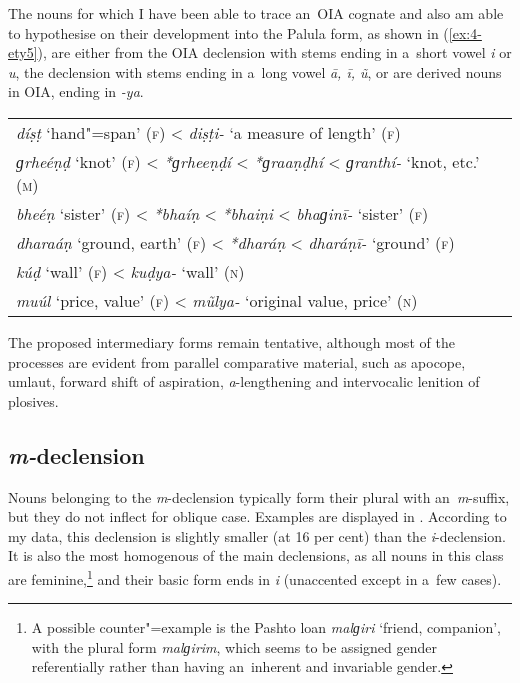 The nouns for which I have been able to trace an~OIA cognate and also am able to hypothesise on their development into the Palula form, as shown in (\ref{ex:4-ety5}), are either from the OIA declension with stems ending in a~short vowel \textit{i} or \textit{u}, the declension with stems ending in a~long vowel \textit{ā, ī, ũ}, or are derived nouns in OIA, ending in \textit{-ya}.


\begin{exe}
\extab
\label{ex:4-ety5}
\begin{tabular}{ l }
\textit{díṣṭ} `hand"=span' (\textsc{f}) {\textless} \textit{diṣṭi-} `a measure of length' (\textsc{f})\\
\textit{ɡrheéṇḍ} `knot' (\textsc{f}) {\textless} \textit{*ɡrheeṇḍí} {\textless} \textit{*ɡraaṇḍhí} {\textless} \textit{ɡranthí-} `knot, etc.' (\textsc{m})\\
\textit{bheéṇ} `sister' (\textsc{f}) {\textless} \textit{*bhaíṇ} {\textless} \textit{*bhaiṇi} {\textless} \textit{bhaɡinī-} `sister' (\textsc{f})\\
\textit{dharaáṇ} `ground, earth' (\textsc{f}) {\textless} \textit{*dharáṇ} {\textless} \textit{dharáṇī-} `ground' (\textsc{f})\\
\textit{kúḍ} `wall' (\textsc{f}) {\textless} \textit{kuḍya-} `wall' (\textsc{n})\\
\textit{muúl} `price, value' (\textsc{f}) {\textless} \textit{mũlya-} `original value, price' (\textsc{n})
\end{tabular}
\end{exe}


The proposed intermediary forms remain tentative, although most of the processes are evident from parallel comparative material, such as apocope, umlaut, forward shift of aspiration, \textit{a}-lengthening and intervocalic lenition of plosives.

\subsection{\textit{m-}declension}
\label{subsec:4-6-3}

Nouns belonging to the \textit{m}-declension typically form their plural with an~\textit{m}-suffix, but they do not inflect for oblique case. Examples are displayed in . According to my data, this declension is slightly smaller (at 16 per cent) than the \textit{i}-declension. It is also the most homogenous of the main declensions, as all nouns in this class are feminine,\footnote{A possible counter"=example is the Pashto loan \textit{malɡiri} `friend, companion', with the plural form \textit{malɡirim}, which seems to be assigned gender referentially rather than having an~inherent and invariable gender.} and their basic form ends in \textit{i} (unaccented except in a~few cases).


